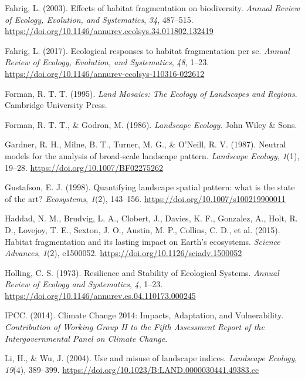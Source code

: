 \documentclass[
  portuguese,
  11pt,
  a4paper,
  open=any]{scrbook}
\newlength{\cslhangindent}
\newenvironment{CSLReferences}[2] %
 {\begin{list}{}{%
  \setlength{\itemindent}{0pt}
  \setlength{\leftmargin}{0pt}
  \setlength{\parsep}{0pt}
  \ifodd #1
   \setlength{\leftmargin}{\cslhangindent}
   \setlength{\itemindent}{-1\cslhangindent}
  \fi
  \setlength{\itemsep}{#2\baselineskip}}}
 {\end{list}}
\begin{document}
\begin{CSLReferences}{1}{0}
Fahrig, L. (2003). Effects of habitat fragmentation on biodiversity.
\emph{Annual Review of Ecology, Evolution, and Systematics}, \emph{34},
487--515. \url{https://doi.org/10.1146/annurev.ecolsys.34.011802.132419}

Fahrig, L. (2017). Ecological responses to habitat fragmentation per se.
\emph{Annual Review of Ecology, Evolution, and Systematics}, \emph{48},
1--23. \url{https://doi.org/10.1146/annurev-ecolsys-110316-022612}

Forman, R. T. T. (1995). \emph{Land Mosaics: The Ecology of Landscapes
and Regions}. Cambridge University Press.

Forman, R. T. T., \& Godron, M. (1986). \emph{Landscape Ecology}. John
Wiley \& Sons.

Gardner, R. H., Milne, B. T., Turner, M. G., \& O'Neill, R. V. (1987).
Neutral models for the analysis of broad-scale landscape pattern.
\emph{Landscape Ecology}, \emph{1}(1), 19--28.
\url{https://doi.org/10.1007/BF02275262}

Gustafson, E. J. (1998). Quantifying landscape spatial pattern: what is
the state of the art? \emph{Ecosystems}, \emph{1}(2), 143--156.
\url{https://doi.org/10.1007/s100219900011}

Haddad, N. M., Brudvig, L. A., Clobert, J., Davies, K. F., Gonzalez, A.,
Holt, R. D., Lovejoy, T. E., Sexton, J. O., Austin, M. P., Collins, C.
D., et al. (2015). Habitat fragmentation and its lasting impact on
Earth's ecosystems. \emph{Science Advances}, \emph{1}(2), e1500052.
\url{https://doi.org/10.1126/sciadv.1500052}

Holling, C. S. (1973). Resilience and Stability of Ecological Systems.
\emph{Annual Review of Ecology and Systematics}, \emph{4}, 1--23.
\url{https://doi.org/10.1146/annurev.es.04.110173.000245}

IPCC. (2014). Climate Change 2014: Impacts, Adaptation, and
Vulnerability. \emph{Contribution of Working Group II to the Fifth
Assessment Report of the Intergovernmental Panel on Climate Change}.

Li, H., \& Wu, J. (2004). Use and misuse of landscape indices.
\emph{Landscape Ecology}, \emph{19}(4), 389--399.
\url{https://doi.org/10.1023/B:LAND.0000030441.49383.cc}


\end{CSLReferences}
\end{document}
